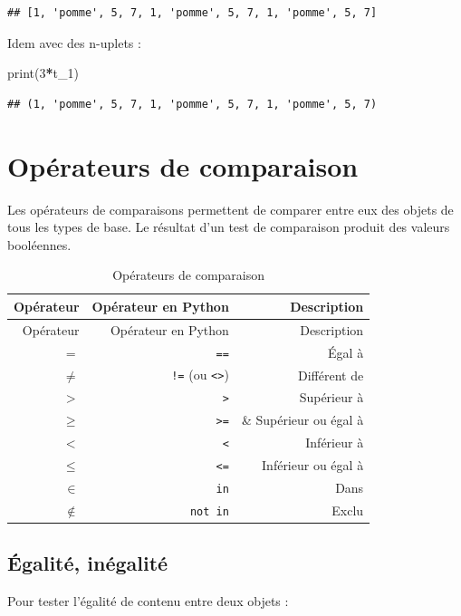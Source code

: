 \documentclass[12pt,]{book}
\newenvironment{Shaded}{\begin{snugshade}}{\end{snugshade}}
\newcommand{\DecValTok}[1]{\textcolor[rgb]{0.00,0.00,0.81}{#1}}
\newcommand{\OperatorTok}[1]{\textcolor[rgb]{0.81,0.36,0.00}{\textbf{#1}}}
\newcommand{\BuiltInTok}[1]{#1}
\newcommand{\NormalTok}[1]{#1}
\numberwithin{equation}{section}
\numberwithin{countremarque}{section}
\begin{document}
\begin{lstlisting}
## [1, 'pomme', 5, 7, 1, 'pomme', 5, 7, 1, 'pomme', 5, 7]
\end{lstlisting}

Idem avec des n-uplets :

\begin{Shaded}
\begin{Highlighting}[]
\BuiltInTok{print}\NormalTok{(}\DecValTok{3}\OperatorTok{*}\NormalTok{t_1)}
\end{Highlighting}
\end{Shaded}

\begin{lstlisting}
## (1, 'pomme', 5, 7, 1, 'pomme', 5, 7, 1, 'pomme', 5, 7)
\end{lstlisting}

\section{Opérateurs de comparaison}\label{operateurs-de-comparaison}

Les opérateurs de comparaisons permettent de comparer entre eux des
objets de tous les types de base. Le résultat d'un test de comparaison
produit des valeurs booléennes.

\begin{longtable}[]{@{}rrr@{}}
\caption{\label{tab:operateurs-comparaison} Opérateurs de
comparaison}\tabularnewline
\toprule
Opérateur & Opérateur en Python & Description\tabularnewline
\midrule
\endfirsthead
\toprule
Opérateur & Opérateur en Python & Description\tabularnewline
\midrule
\endhead
\(=\) & \texttt{==} & Égal à\tabularnewline
\(\ne\) & \texttt{!=} (ou \texttt{\textless{}\textgreater{}}) &
Différent de\tabularnewline
\(>\) & \texttt{\textgreater{}} & Supérieur à\tabularnewline
\(\geq\) & \texttt{\textgreater{}=} & \& Supérieur ou égal
à\tabularnewline
\(<\) & \texttt{\textless{}} & Inférieur à\tabularnewline
\(\leq\) & \texttt{\textless{}=} & Inférieur ou égal à\tabularnewline
\(\in\) & \texttt{in} & Dans\tabularnewline
\(\notin\) & \texttt{not\ in} & Exclu\tabularnewline
\bottomrule
\end{longtable}

\subsection{Égalité, inégalité}\label{egalite-inegalite}

Pour tester l'égalité de contenu entre deux objets :
\end{document}
